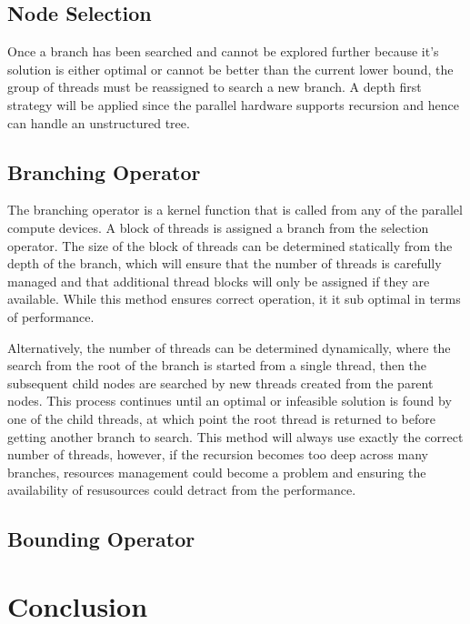 \documentclass[10pt,a4paer,twocolumn]{article}
\begin{document}
\subsection{Node Selection}

Once a branch has been searched and cannot be explored further because it's solution is either optimal or
cannot be better than the current lower bound, the group of threads must be reassigned to search a new branch.
A depth first strategy will be applied since the parallel hardware supports recursion and hence can handle an
unstructured tree.

\subsection{Branching Operator}

The branching operator is a kernel function that is called from any of the parallel compute devices. A block
of threads is assigned a branch from the selection operator. The size of the block of threads can be
determined statically from the depth of the branch, which will ensure that the number of threads is carefully
managed and that additional thread blocks will only be assigned if they are available. While this method
ensures correct operation, it it sub optimal in terms of performance. 

Alternatively, the number of threads can be determined dynamically, where the search from the root of the
branch is started from a single thread, then the subsequent child nodes are searched by new threads created
from the parent nodes. This process continues until an optimal or infeasible solution is found by one of the
child threads, at which point the root thread is returned to before getting another branch to search. This
method will always use exactly the correct number of threads, however, if the recursion becomes too deep
across many branches, resources management could become a problem and ensuring the availability of resusources
could detract from the performance.

\subsection{Bounding Operator}




\section{Conclusion} \label{sec:conc}
\end{document}
